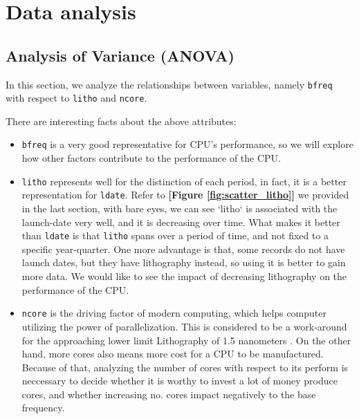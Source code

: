 %
%   
\clearpage
\section{Data analysis}
\label{section:data_analysis}









\subsection{Analysis of Variance (ANOVA)}

In this section, we analyze the relationships between variables, namely \verb|bfreq| with respect to \verb|litho| and \verb|ncore|.

There are interesting facts about the above attributes:
\begin{itemize}
    \item \verb|bfreq| is a very good representative for CPU's performance, so we will explore
    how other factors contribute to the performance of the CPU.
    \item \verb|litho| represents well for the distinction of each period, in fact, it is
    a better representation for \verb|ldate|. Refer to \textbf{[Figure \ref{fig:scatter_litho}]} we provided in the last section,
    with bare eyes, we can see `litho` is associated with the launch-date very well, and
    it is decreasing over time. What makes it better than \verb|ldate| is that \verb|litho| spans
    over a period of time, and not fixed to a specific year-quarter. One more advantage
    is that, some records do not have launch dates, but they have lithography instead, so using
    it is better to gain more data. We would like to see the impact of decreasing lithography
    on the performance of the CPU.
    \item \verb|ncore| is the driving factor of modern computing, which helps computer utilizing 
    the power of parallelization. This is considered to be a work-around for the approaching lower limit Lithography of 1.5 nanometers
    \cite{2nm-barrier}. On the other hand, more cores also means more cost 
    for a CPU to be manufactured. Because of that, analyzing the number of cores with respect to its perform is neccessary to decide
    whether it is worthy to invest a lot of money produce cores, and whether increasing no. cores impact negatively to the base frequency.
\end{itemize}

